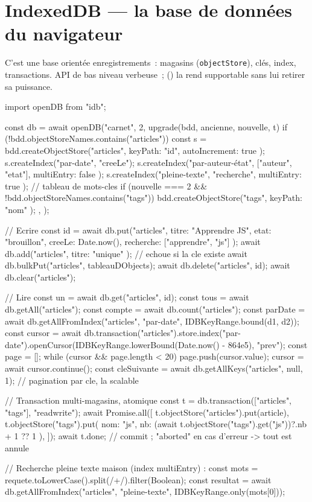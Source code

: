 \section{IndexedDB --- la base de donn\'ees du navigateur}

C'est une base orient\'ee enregistrements~: magasins (\texttt{objectStore}), cl\'es, index,
transactions. API de bas niveau verbeuse~; 
() la rend supportable sans lui retirer sa puissance.

\begin{codejs}
import { openDB } from "idb";

const db = await openDB("carnet", 2, {
  upgrade(bdd, ancienne, nouvelle, t) {
    if (!bdd.objectStoreNames.contains("articles")) {
      const s = bdd.createObjectStore("articles", { keyPath: "id", autoIncrement: true });
      s.createIndex("par-date", "creeLe");
      s.createIndex("par-auteur-\'etat", ["auteur", "etat"], { multiEntry: false });
      s.createIndex("pleine-texte", "recherche", { multiEntry: true });   // tableau de mots-cles
    }
    if (nouvelle === 2 && !bdd.objectStoreNames.contains("tags")) {
      bdd.createObjectStore("tags", { keyPath: "nom" });
    }
  },
});

// Ecrire
const id = await db.put("articles", { titre: "Apprendre JS", etat: "brouillon", creeLe: Date.now(), recherche: ["apprendre", "js"] });
await db.add("articles", { titre: "unique" });           // echoue si la cle existe
await db.bulkPut("articles", tableauDObjects);
await db.delete("articles", id);
await db.clear("articles");

// Lire
const un = await db.get("articles", id);
const tous = await db.getAll("articles");
const compte = await db.count("articles");
const parDate = await db.getAllFromIndex("articles", "par-date", IDBKeyRange.bound(d1, d2));
const cursor = await db.transaction("articles").store.index("par-date").openCursor(IDBKeyRange.lowerBound(Date.now() - 864e5), "prev");
const page = [];
while (cursor && page.length < 20) { page.push(cursor.value); cursor = await cursor.continue(); }
const cleSuivante = await db.getAllKeys("articles", null, 1);   // pagination par cle, la scalable

// Transaction multi-magasins, atomique
const t = db.transaction(["articles", "tags"], "readwrite");
await Promise.all([
  t.objectStore("articles").put(article),
  t.objectStore("tags").put({ nom: "js", nb: (await t.objectStore("tags").get("js"))?.nb + 1 ?? 1 }),
]);
await t.done;      // commit ; "aborted" en cas d'erreur -> tout est annule

// Recherche pleine texte maison (index multiEntry) :
const mots = requete.toLowerCase().split(/\s+/).filter(Boolean);
const resultat = await db.getAllFromIndex("articles", "pleine-texte", IDBKeyRange.only(mots[0]));
\end{codejs}

